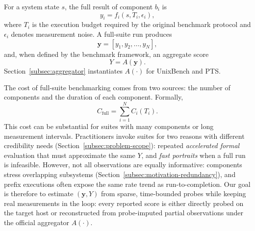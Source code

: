 \documentclass[sigplan,10pt]{acmart}
\begin{document}
For a system state \(s\), the full result of component \(b_i\) is
\begin{equation}
\label{eq:component-score}
y_i = f_i(s,T_i,\epsilon_i),
\end{equation}
where \(T_i\) is the execution budget required by the original benchmark protocol and \(\epsilon_i\) denotes measurement noise. A full-suite run produces
\begin{equation}
\label{eq:result-vector}
\mathbf{y}=[y_1,y_2,\ldots,y_N],
\end{equation}
and, when defined by the benchmark framework, an aggregate score
\begin{equation}
\label{eq:aggregate-score}
Y=A(\mathbf{y}).
\end{equation}
Section~\ref{subsec:aggregator} instantiates $A(\cdot)$ for UnixBench and PTS.

The cost of full-suite benchmarking comes from two sources: the number of components and the duration of each component. Formally,
\begin{equation}
\label{eq:full-cost}
C_{\mathrm{full}}=\sum_{i=1}^{N}C_i(T_i).
\end{equation}
This cost can be substantial for suites with many components or long measurement intervals.
Practitioners invoke suites for two reasons with different credibility needs (Section~\ref{subsec:problem-scope}): repeated \emph{accelerated formal} evaluation that must approximate the same $Y$, and \emph{fast portraits} when a full run is infeasible.
However, not all observations are equally informative: components stress overlapping subsystems (Section~\ref{subsec:motivation-redundancy}), and prefix executions often expose the same rate trend as run-to-completion.
Our goal is therefore to estimate $(\mathbf{y},Y)$ from sparse, time-bounded probes while keeping real measurements in the loop: every reported score is either directly probed on the target host or reconstructed from probe-imputed partial observations under the official aggregator $A(\cdot)$.
\end{document}
